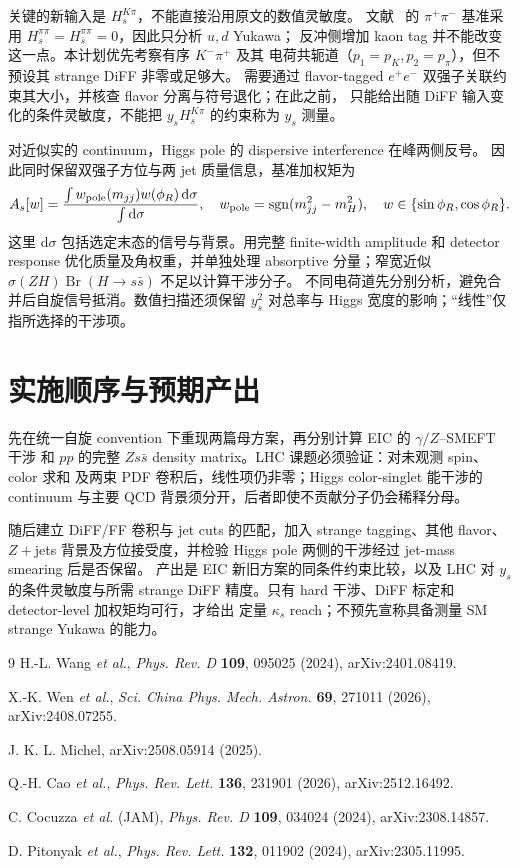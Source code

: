 \documentclass[UTF8,a4paper,zihao=-4,fontset=fandol]{ctexart}
\newcommand{\dd}{\mathrm d}
\begin{document}
关键的新输入是 \(H_s^{K\pi}\)，不能直接沿用原文的数值灵敏度。
文献~\cite{Cao:2025wfg} 的 \(\pi^+\pi^-\) 基准采用
\(H_s^{\pi\pi}=H_{\bar s}^{\pi\pi}=0\)，因此只分析 \(u,d\) Yukawa；
反冲侧增加 kaon tag 并不能改变这一点。本计划优先考察有序 \(K^-\pi^+\) 及其
电荷共轭道（\(p_1=p_K,p_2=p_\pi\)），但不预设其 strange DiFF 非零或足够大。
需要通过 flavor-tagged \(e^+e^-\) 双强子关联约束其大小，并核查 flavor 分离与符号退化；在此之前，
只能给出随 DiFF 输入变化的条件灵敏度，不能把 \(y_sH_s^{K\pi}\) 的约束称为 \(y_s\) 测量。

对近似实的 continuum，Higgs pole 的 dispersive interference 在峰两侧反号。
因此同时保留双强子方位与两 jet 质量信息，基准加权矩为
\[
 A_s[w]=\frac{\int w_{\rm pole}(m_{jj})w(\phi_R)\,\dd\sigma}
 {\int\dd\sigma},
 \quad
 w_{\rm pole}={\rm sgn}(m_{jj}^{2}-m_H^2),
 \quad w\in\{\sin\phi_R,\cos\phi_R\}.
\]
这里 \(\dd\sigma\) 包括选定末态的信号与背景。用完整 finite-width amplitude 和
detector response 优化质量及角权重，并单独处理 absorptive 分量；窄宽近似
\(\sigma(ZH)\operatorname{Br}(H\to s\bar s)\) 不足以计算干涉分子。
不同电荷道先分别分析，避免合并后自旋信号抵消。数值扫描还须保留 \(y_s^2\) 对总率与
Higgs 宽度的影响；“线性”仅指所选择的干涉项。

\section{实施顺序与预期产出}

先在统一自旋 convention 下重现两篇母方案，再分别计算 EIC 的 \(\gamma/Z\)--SMEFT 干涉
和 \(pp\) 的完整 \(Zs\bar s\) density matrix。LHC 课题必须验证：对未观测 spin、color 求和
及两束 PDF 卷积后，线性项仍非零；Higgs color-singlet 能干涉的 continuum 与主要
QCD 背景须分开，后者即使不贡献分子仍会稀释分母。

随后建立 DiFF/FF 卷积与 jet cuts 的匹配，加入 strange tagging、其他 flavor、
\(Z+\)jets 背景及方位接受度，并检验 Higgs pole 两侧的干涉经过 jet-mass smearing 后是否保留。
产出是 EIC 新旧方案的同条件约束比较，以及 LHC 对 \(y_s\) 的条件灵敏度与所需
strange DiFF 精度。只有 hard 干涉、DiFF 标定和 detector-level 加权矩均可行，才给出
定量 \(\kappa_s\) reach；不预先宣称具备测量 SM strange Yukawa 的能力。

\begin{thebibliography}{9}
\scriptsize
\setlength{\itemsep}{0pt}
\setlength{\parsep}{0pt}
H.-L. Wang \emph{et al.}, \emph{Phys. Rev. D} \textbf{109}, 095025 (2024), arXiv:2401.08419.

X.-K. Wen \emph{et al.}, \emph{Sci. China Phys. Mech. Astron.} \textbf{69}, 271011 (2026),
arXiv:2408.07255.

J. K. L. Michel, arXiv:2508.05914 (2025).

Q.-H. Cao \emph{et al.}, \emph{Phys. Rev. Lett.} \textbf{136}, 231901 (2026), arXiv:2512.16492.

C. Cocuzza \emph{et al.} (JAM), \emph{Phys. Rev. D} \textbf{109}, 034024 (2024), arXiv:2308.14857.

D. Pitonyak \emph{et al.}, \emph{Phys. Rev. Lett.} \textbf{132}, 011902 (2024), arXiv:2305.11995.

\end{thebibliography}
\end{document}
